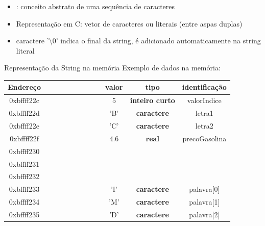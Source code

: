 \documentclass[portuguese,10pt,xcolor=table]{bredelebeamer}
\begin{document}
		\begin{frame}{\insertsection} 
			\begin{itemize}
				\item {}: conceito abstrato de uma sequência de caracteres
				\item Representação em C: vetor de caracteres ou literais (entre aspas duplas)
			
				\item caractere '\textbackslash0' indica o final da string, é adicionado automaticamente na string literal
			\end{itemize}
		\end{frame}

		\begin{frame}{Representação da String na memória}
			Exemplo de dados na memória:
			\tiny
			\setlength{\tabcolsep}{0pt}	
			\begin{table}
				\begin{tabular}{|@{\hskip 0.1cm}c@{\hskip 0.1cm}|c|c|c|c|c|c|c|c|c|c|@{\hskip 0.1cm}c@{\hskip 0.1cm}|}
					\hline
					\textbf{Endereço} & & & & & & & & & \textbf{valor} & \textbf{tipo} & \textbf{identificação}\\\hline
					0xbffff22c & \GN[0]&\GN[0]&\GN[0]&\GN[0]&\GN[0]&\GN[1]&\GN[0]&\GN[1]& 5 & \textbf{inteiro curto} & valorIndice\\\hline
					0xbffff22d & \BN[0]&\BN[1]&\BN[0]&\BN[0]&\BN[0]&\BN[0]&\BN[1]&\BN[0]& 'B' & \textbf{caractere} & letra1\\\hline
					0xbffff22e & \BN[0]&\BN[1]&\BN[0]&\BN[0]&\BN[0]&\BN[0]&\BN[1]&\BN[1]& 'C' & \textbf{caractere} & letra2\\\hline
					0xbffff22f & \RN[1]&\RN[1]&\RN[0]&\RN[1]&\RN[1]&\RN[1]&\RN[0]&\RN[1]& 4.6 & \textbf{real} & precoGasolina\\\hline
					0xbffff230 & \RN[1]&\RN[1]&\RN[0]&\RN[0]&\RN[1]&\RN[1]&\RN[0]&\RN[0]& & & \\\hline
					0xbffff231 & \RN[0]&\RN[1]&\RN[0]&\RN[0]&\RN[1]&\RN[1]&\RN[0]&\RN[0]& & & \\\hline
					0xbffff232 & \RN[0]&\RN[1]&\RN[0]&\RN[0]&\RN[0]&\RN[0]&\RN[0]&\RN[0]& & & \\\hline
					0xbffff233 & \BN[0]&\BN[1]&\BN[0]&\BN[0]&\BN[1]&\BN[0]&\BN[0]&\BN[1]& 'I' & \textbf{caractere} & palavra[0]\\\hline
					0xbffff234 & \BN[0]&\BN[1]&\BN[0]&\BN[0]&\BN[1]&\BN[1]&\BN[0]&\BN[1]& 'M' & \textbf{caractere} & palavra[1]\\\hline
					0xbffff235 & \BN[0]&\BN[1]&\BN[0]&\BN[0]&\BN[0]&\BN[1]&\BN[0]&\BN[0]& 'D' & \textbf{caractere} & palavra[2]\\\hline

\end{tabular}
\end{table}
\end{frame}
\end{document}
